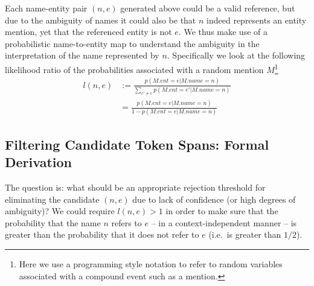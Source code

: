 \documentclass{article}
\begin{document}
Each name-entity pair $(n,e)$ generated above could be a valid reference, but due to the ambiguity of names it could also be that $n$ indeed represents an entity mention, yet that the referenced entity is not $e$. We thus make use of a probabilistic name-to-entity map to understand the ambiguity in the interpretation of the name represented by $n$. Specifically we look at the following likelihood ratio of the probabilities associated with a random mention $M$\footnote{Here we use a programming style notation to refer to random variables associated with a compound event such as a mention.}
\begin{align}
l(n,e) & := \frac{p(M.ent = e | M.name = n)}{\sum_{e' \neq e} p(M.ent = e' | M.name = n)}
\\ & = \frac{p(M.ent = e | M.name = n)}{1-p(M.ent = e | M.name = n)} \nonumber
\end{align}

\subsection*{Filtering Candidate Token Spans: Formal Derivation} 

The question is: what should be an appropriate rejection threshold for eliminating the candidate $(n,e)$ due to lack of confidence (or high degrees of ambiguity)?  We could require $l(n,e) > 1$ in order to make sure that the probability that the name $n$ refers to $e$ -- in a context-independent manner -- is greater than the probability that it does not refer to $e$ (i.e.~is greater than $1/2$). 
\end{document}
